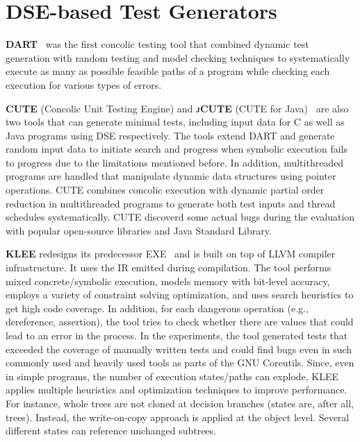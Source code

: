 \documentclass[paper=a4,%
  twoside,%
  BCOR4mm,%
  abstract=true,%
  toc=bibliography,%
  chapterprefix=true,%
  toc=bibliographynumbered,%
  open=right,%
  english,%
  pagesize=pdftex]{scrreprt}
\begin{document}
\section{DSE-based Test Generators}
\textbf{\textsc{DART}}~\cite{Godefroid_2005} was the first concolic testing tool that combined dynamic test generation with random testing and model checking techniques to systematically execute as many as possible feasible paths of a program while checking each execution for various types of errors.


\textbf{\textsc{CUTE}} (Concolic Unit Testing Engine) and \textbf{\textsc{jCUTE}} (CUTE for Java)~\cite{Sen2006} are also two tools that can generate minimal tests, including input data for C as well as Java programs using \ac{DSE} respectively. The tools extend \textsc{DART} and generate random input data to initiate search and progress when symbolic execution fails to progress due to the limitations mentioned before. In addition, multithreaded programs are handled that manipulate dynamic data structures using pointer operations. \textsc{CUTE} combines concolic execution with dynamic partial order reduction in multithreaded programs to generate both test inputs and thread schedules systematically. \textsc{CUTE} discoverd some actual bugs during the evaluation with popular open-source libraries and Java Standard Library.


\textbf{\textsc{KLEE}} redesigns its predecessor \textsc{EXE}~\cite{Cadar2008} and is built on top of LLVM compiler infrastructure. It uses the \ac{IR} emitted during compilation. The tool performs mixed concrete/symbolic execution, models memory with bit-level accuracy, employs a variety of constraint solving optimization, and uses search heuristics to get high code coverage. In addition, for each dangerous operation (e.g., dereference, assertion), the tool tries to check whether there are values that could lead to an error in the process. In the experiments, the tool generated tests that exceeded the coverage of manually written tests and could find bugs even in such commonly used and heavily used tools as parts of the GNU Coreutils. Since, even in simple programs, the number of execution states/paths can explode, \textsc{KLEE} applies multiple heuristics and optimization techniques to improve performance. For instance, whole trees are not cloned at decision branches (states are, after all, trees). Instead, the write-on-copy approach is applied at the object level. Several different states can reference unchanged subtrees. 
\end{document}

